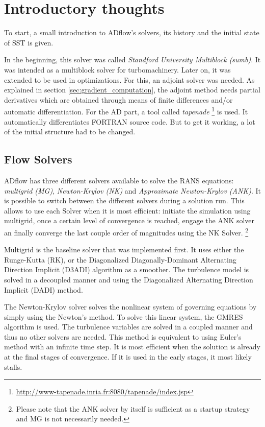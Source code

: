 \section{Introductory thoughts}
To start, a small introduction to ADflow's solvers, its history and the initial
state of SST is given.

In the beginning, this solver was called \textit{Standford University
Multiblock (sumb)}. It was intended as a multiblock solver for turbomachinery.
Later on, it was extended to be used in optimizations. For this, an adjoint
solver was needed. As explained in section \ref{sec:gradient_computation}, the
adjoint method needs partial derivatives which are obtained through means of
finite differences and/or automatic differentiation. For the AD part, a tool
called \textit{tapenade}
\footnote{\url{http://www-tapenade.inria.fr:8080/tapenade/index.jsp}} is used.
It automatically differentiates FORTRAN source code. But to get it working, a
lot of the initial structure had to be changed.




\subsection{Flow Solvers}
ADflow has three different solvers available to solve the RANS equations:
\textit{multigrid (MG)}, \textit{Newton-Krylov (NK)} and \textit{Approximate
Newton-Krylov (ANK)}. It is possible to switch between
the different solvers during a solution run. This allows to use each Solver
when it is most efficient: initiate the simulation using multigrid, once a
certain level of convergence is reached, engage the ANK solver an finally
converge the last couple order of magnitudes using the NK Solver.
\footnote{Please note that the ANK solver by itself is sufficient as a startup
strategy and MG is not necessarily needed.}

Multigrid is the baseline solver that was implemented first. It uses either the
Runge-Kutta (RK), or the Diagonalized Diagonally-Dominant Alternating Direction
Implicit (D3ADI) algorithm as a smoother. The turbulence model is solved in a
decoupled manner and using the Diagonalized Alternating Direction Implicit
(DADI) method.

The Newton-Krylov solver solves the nonlinear system of governing equations by
simply using the Newton's method. To solve this linear system, the GMRES
algorithm is used. The turbulence variables are solved in a coupled manner and
thus no other solvers are needed. This method is equivalent to using Euler's
method with an infinite time step. It is most efficient when the solution is
already at the final stages of convergence. If it is used in the early stages,
it most likely stalls.

